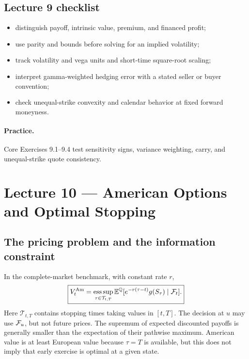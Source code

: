 \subsection*{Lecture 9 checklist}
\begin{itemize}[leftmargin=1.5em,itemsep=0.15em]
\item distinguish payoff, intrinsic value, premium, and financed profit;
\item use parity and bounds before solving for an implied volatility;
\item track volatility and vega units and short-time square-root scaling;
\item interpret gamma-weighted hedging error with a stated seller or buyer convention;
\item check unequal-strike convexity and calendar behavior at fixed forward moneyness.
\end{itemize}
\paragraph{Practice.} Core Exercises 9.1--9.4 test sensitivity signs,
variance weighting, carry, and unequal-strike quote consistency.

\section{Lecture 10 --- American Options and Optimal Stopping}
\label{syn:lecture10}

\subsection{The pricing problem and the information constraint}
In the complete-market benchmark, with constant rate \(r\),
\[
\boxed{V_t^{\rm Am}=\operatorname*{ess\,sup}_{\tau\in\mathcal T_{t,T}}
\mathbb{E}^{\mathbb{Q}}[e^{-r(\tau-t)}g(S_\tau)\mid\mathcal{F}_t].}
\]
Here \(\mathcal T_{t,T}\) contains stopping times taking values in
\([t,T]\). The decision at \(u\) may use \(\mathcal{F}_u\), but not future prices.
The supremum of expected discounted payoffs is generally smaller than the
expectation of their pathwise maximum. American value is at least European
value because \(\tau=T\) is available, but this does not imply that early
exercise is optimal at a given state.

